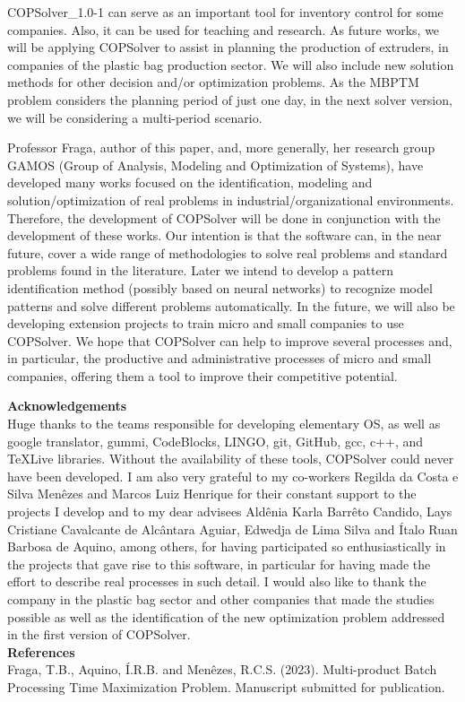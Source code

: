 \documentclass[11pt, letterpaper]{article}
\begin{document}
COPSolver\_1.0-1 can serve as an important tool for inventory control for some companies. Also, it can be used for teaching and research. As future works, we will be applying COPSolver to assist in planning the production of extruders, in companies of the plastic bag production sector. We will also include new solution methods for other decision and/or optimization problems. As the MBPTM problem considers the planning period of just one day, in the next solver version, we will be considering a multi-period scenario.

Professor Fraga, author of this paper, and, more generally, her research group GAMOS (Group of Analysis, Modeling and Optimization of Systems), have developed many works focused on the identification, modeling and solution/optimization of real problems in industrial/organizational environments. Therefore, the development of COPSolver will be done in conjunction with the development of these works. Our intention is that the software can, in the near future, cover a wide range of methodologies to solve real problems and standard problems found in the literature. Later we intend to develop a pattern identification method (possibly based on neural networks) to recognize model patterns and solve different problems automatically. In the future, we will also be developing extension projects to train micro and small companies to use COPSolver. We hope that COPSolver can help to improve several processes and, in particular, the productive and administrative processes of micro and small companies, offering them a tool to improve their competitive potential.

\vskip0.3cm
\noindent
\textbf{Acknowledgements}\\
Huge thanks to the teams responsible for developing elementary OS, as well as google translator, gummi, CodeBlocks, LINGO, git, GitHub, gcc, c++, and TeXLive libraries. Without the availability of these tools, COPSolver could never have been developed. I am also very grateful to my co-workers Regilda da Costa e Silva Menêzes and Marcos Luiz Henrique for their constant support to the projects I develop and to my dear advisees Aldênia Karla Barrêto Candido, Lays Cristiane Cavalcante de Alcântara Aguiar, Edwedja de Lima Silva and Ítalo Ruan Barbosa de Aquino, among others, for having participated so enthusiastically in the projects that gave rise to this software, in particular for having made the effort to describe real processes in such detail. I would also like to thank the company in the plastic bag sector and other companies that made the studies possible as well as the identification of the new optimization problem addressed in the first version of COPSolver. \\

\noindent
\textbf{References}\\
Fraga, T.B., Aquino, Í.R.B. and Menêzes, R.C.S. (2023). Multi-product Batch Processing Time Maximization
Problem. Manuscript submitted for publication.  \\

\vskip 1.5cm
\end{document}
